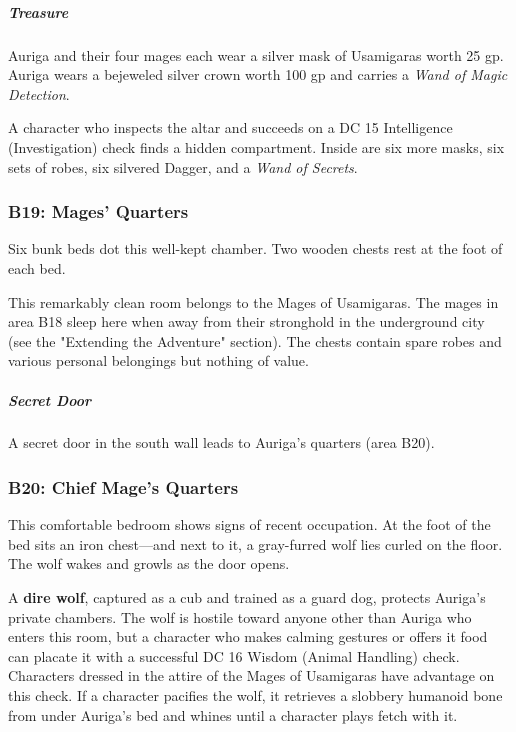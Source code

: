 \documentclass[10pt,a4paper,twoside,bg=print,twocolumn,openany,nodeprecatedcode]{dndbook}
\begin{document}
\subparagraph{Treasure}
Auriga and their four mages each wear a silver mask of Usamigaras worth 25 gp. Auriga wears a bejeweled silver crown worth 100 gp and carries a \textit{Wand of Magic Detection}.

A character who inspects the altar and succeeds on a DC 15 Intelligence (Investigation) check finds a hidden compartment. Inside are six more masks, six sets of robes, six silvered Dagger, and a \textit{Wand of Secrets}.

\subsubsection{B19: Mages' Quarters}
\begin{DndReadAloud}{}
Six bunk beds dot this well-kept chamber. Two wooden chests rest at the foot of each bed.

\end{DndReadAloud}

This remarkably clean room belongs to the Mages of Usamigaras. The mages in area B18 sleep here when away from their stronghold in the underground city (see the "Extending the Adventure" section). The chests contain spare robes and various personal belongings but nothing of value.

\subparagraph{Secret Door}
A secret door in the south wall leads to Auriga's quarters (area B20).

\subsubsection{B20: Chief Mage's Quarters}
\begin{DndReadAloud}{}
This comfortable bedroom shows signs of recent occupation. At the foot of the bed sits an iron chest—and next to it, a gray-furred wolf lies curled on the floor. The wolf wakes and growls as the door opens.

\end{DndReadAloud}

A \textbf{dire wolf}, captured as a cub and trained as a guard dog, protects Auriga's private chambers. The wolf is hostile toward anyone other than Auriga who enters this room, but a character who makes calming gestures or offers it food can placate it with a successful DC 16 Wisdom (Animal Handling) check. Characters dressed in the attire of the Mages of Usamigaras have advantage on this check. If a character pacifies the wolf, it retrieves a slobbery humanoid bone from under Auriga's bed and whines until a character plays fetch with it.
\end{document}
